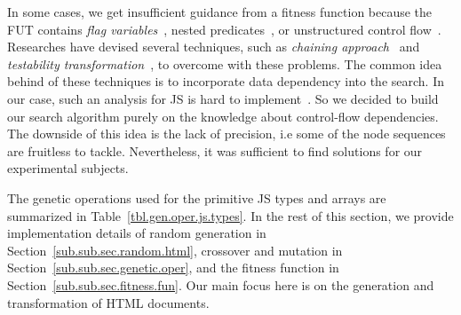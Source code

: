 In some cases, we get insufficient guidance from a fitness function because the FUT contains \emph{flag variables}~\cite{baresel2004evolutionary}, nested predicates~\cite{mcminn2005testability}, or unstructured control flow~\cite{hierons2005branch}. Researches have devised several techniques, such as \emph{chaining approach}~\cite{ferguson1996chaining,mcminn2006evolutionary} and \emph{testability transformation}~\cite{korel2005data}, to overcome with these problems. The common idea behind of these techniques is to incorporate data dependency into the search. In our case, such an analysis for JS is hard to implement~\cite{jang2009points}. So we decided to build our search algorithm purely on the knowledge about control-flow dependencies. The downside of this idea is the lack of precision, i.e some of the node sequences are fruitless to tackle. Nevertheless, it was sufficient to find solutions for our experimental subjects.

The genetic operations used for the primitive JS types and arrays are summarized in Table~\ref{tbl.gen.oper.js.types}. In the rest of this section, we provide implementation details of random generation in Section~\ref{sub.sub.sec.random.html}, crossover and mutation in Section~\ref{sub.sub.sec.genetic.oper}, and the fitness function in Section~\ref{sub.sub.sec.fitness.fun}. Our main focus here is on the generation and transformation of HTML documents.

